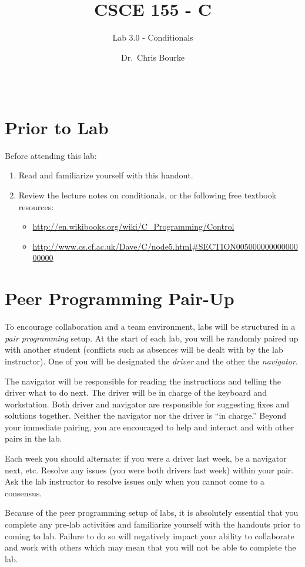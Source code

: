 \documentclass[12pt]{scrartcl}
\title{CSCE 155 - C}
\subtitle{Lab 3.0 - Conditionals}
\author{Dr.\ Chris Bourke}
\date{~}
\begin{document}
\maketitle

\section*{Prior to Lab}

Before attending this lab:
\begin{enumerate}
  \item Read and familiarize yourself with this handout.
  \item Review the lecture notes on conditionals, or the following free textbook resources:
	\begin{itemize}
  	  \item \url{http://en.wikibooks.org/wiki/C_Programming/Control}
	  \item \url{http://www.cs.cf.ac.uk/Dave/C/node5.html#SECTION00500000000000000000}
	\end{itemize}
\end{enumerate}

\section*{Peer Programming Pair-Up}

To encourage collaboration and a team environment, labs will be
structured in a \emph{pair programming} setup.  At the start of
each lab, you will be randomly paired up with another student 
(conflicts such as absences will be dealt with by the lab instructor).
One of you will be designated the \emph{driver} and the other
the \emph{navigator}.  

The navigator will be responsible for reading the instructions and
telling the driver what to do next.  The driver will be in charge of the
keyboard and workstation.  Both driver and navigator are responsible
for suggesting fixes and solutions together.  Neither the navigator
nor the driver is ``in charge.''  Beyond your immediate pairing, you
are encouraged to help and interact and with other pairs in the lab.

Each week you should alternate: if you were a driver last week, 
be a navigator next, etc.  Resolve any issues (you were both drivers
last week) within your pair.  Ask the lab instructor to resolve issues
only when you cannot come to a consensus.  

Because of the peer programming setup of labs, it is absolutely 
essential that you complete any pre-lab activities and familiarize
yourself with the handouts prior to coming to lab.  Failure to do
so will negatively impact your ability to collaborate and work with 
others which may mean that you will not be able to complete the
lab.  
\end{document}
